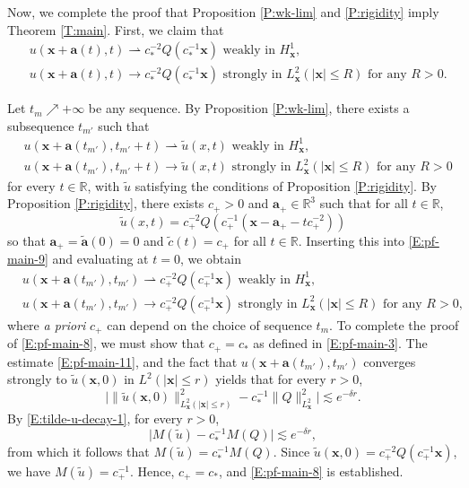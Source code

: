 \documentclass[12pt,letterpaper]{amsart}
\theoremstyle{remark}
\numberwithin{equation}{section}
\numberwithin{theorem}{section}
\numberwithin{table}{section}
\begin{document}
Now, we complete the proof that Proposition \ref{P:wk-lim} and \ref{P:rigidity} imply Theorem \ref{T:main}.    First, we claim that
\begin{equation}
\label{E:pf-main-8}
\begin{aligned}
&u(\mathbf{x}+\mathbf{a}(t),t) \rightharpoonup c_*^{-2} Q(c_*^{-1}\mathbf{x}) \text{ weakly in }H_{\mathbf{x}}^1,\\
&u(\mathbf{x}+\mathbf{a}(t),t) \to c_*^{-2} Q(c_*^{-1}\mathbf{x}) \text{ strongly in }L_{\mathbf{x}}^2(|\mathbf{x}|\leq R) \text{ for any }R>0 . 
\end{aligned}
\end{equation}

Let $t_m \nearrow +\infty$ be any sequence.  By Proposition \ref{P:wk-lim}, there exists a subsequence $t_{m'}$ such that
\begin{equation}
\label{E:pf-main-9}
\begin{aligned}
&u(\mathbf{x}+ \mathbf{a}(t_{m'}),t_{m'}+t) \rightharpoonup \tilde u(x,t) \text{ weakly in }H_{\mathbf{x}}^1,\\
&u(\mathbf{x}+ \mathbf{a}(t_{m'}),t_{m'}+t) \to \tilde u(x,t) \text{ strongly in }L_{\mathbf{x}}^2(|\mathbf{x}|\leq R)\text{ for any }R>0  
\end{aligned}
\end{equation}
for every $t\in \mathbb{R}$, with $\tilde u$ satisfying the conditions of Proposition \ref{P:rigidity}.  By Proposition \ref{P:rigidity}, there exists $c_+>0$ and $\mathbf{a}_+\in \mathbb{R}^3$ such that for all $t\in \mathbb{R}$,
$$
\tilde u(x,t) = c_+^{-2}Q(c_+^{-1}(\mathbf{x}-\mathbf{a}_+-tc_+^{-2}))
$$
so that $\mathbf{a}_+= \tilde{\mathbf{a}}(0) = 0$ and $\tilde c(t)=c_+$ for all $t\in \mathbb{R}$. 
Inserting this into \eqref{E:pf-main-9} and evaluating at $t=0$, we obtain
\begin{equation}
\label{E:pf-main-10}
\begin{aligned}
&u(\mathbf{x}+\mathbf{a}(t_{m'}),t_{m'}) \rightharpoonup c_+^{-2} Q(c_+^{-1}\mathbf{x}) \text{ weakly in }H_{\mathbf{x}}^1,\\
&u(\mathbf{x}+\mathbf{a}(t_{m'}),t_{m'}) \to c_+^{-2} Q(c_+^{-1}\mathbf{x}) \text{ strongly in }L_{\mathbf{x}}^2(|\mathbf{x}|\leq R) \text{ for any }R>0, 
\end{aligned}
\end{equation}
where \emph{a priori} $c_+$ can depend on the choice of sequence $t_m$.   To complete the proof of \eqref{E:pf-main-8}, we must show that  $c_+=c_*$ as defined in \eqref{E:pf-main-3}.   The estimate \eqref{E:pf-main-11}, and the fact that $u(\mathbf{x}+\mathbf{a}(t_{m'}),t_{m'})$ converges strongly to $\tilde u(\mathbf{x},0)$ in $L^2(|\mathbf{x}|\leq r)$ yields that for every $r>0$,
$$
\Big| \| \tilde u( \mathbf{x},0) \|_{L_{\mathbf{x}}^2(|\mathbf{x}|\leq r)}^2 - c_*^{-1} \|Q\|_{L_{\mathbf{x}}^2}^2 \Big| \lesssim e^{-\delta r}.
$$
By \eqref{E:tilde-u-decay-1}, for every $r>0$,
$$
\Big| M(\tilde u) - c_*^{-1} M(Q)\Big| \lesssim e^{-\delta r},
$$
from which it follows that $M(\tilde u)= c_*^{-1}M(Q)$.   Since $\tilde u(\mathbf{x},0) = c_+^{-2}Q(c_+^{-1}\mathbf{x})$, we have $M(\tilde u) = c_+^{-1}$.  Hence, $c_+=c_*$, and \eqref{E:pf-main-8} is established.    
\end{document}
